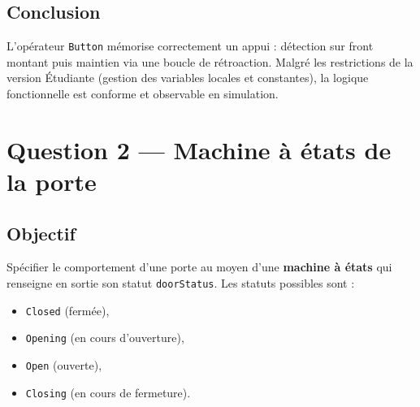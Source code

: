 \documentclass[11pt,a4paper]{report}
\begin{document}
\section*{Conclusion}
L’opérateur \texttt{Button} mémorise correctement un appui : détection sur front montant puis maintien via une boucle de rétroaction.  
Malgré les restrictions de la version Étudiante (gestion des variables locales et constantes), la logique fonctionnelle est conforme et observable en simulation.


\chapter{Question 2 — Machine à états de la porte}

\section*{Objectif}
Spécifier le comportement d’une porte au moyen d’une \textbf{machine à états} qui renseigne en sortie son statut \texttt{doorStatus}.  
Les statuts possibles sont :
\begin{itemize}
  \item \texttt{Closed} (fermée),
  \item \texttt{Opening} (en cours d’ouverture),
  \item \texttt{Open} (ouverte),
  \item \texttt{Closing} (en cours de fermeture).
\end{itemize}
\end{document}
